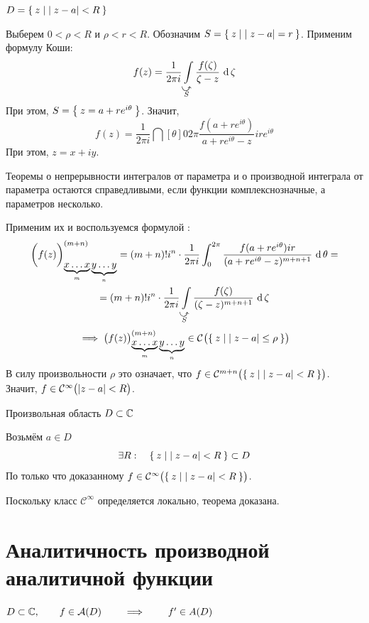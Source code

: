 \begin{eproof}
	\item $ D = \set{z \mid |z - a| < R} $

	Выберем $ 0 < \rho < R $ и $ \rho < r < R $. Обозначим $ S = \set{z \mid |z - a| = r} $. Применим формулу Коши:
	$$ f(z) = \frac1{2\pi i} \cint[\zeta]{\curvedir S}{\frac{f(\zeta)}{\zeta - z}} $$
	При этом, $ S = \set{z = a + re^{i\theta}} $. Значит,
	$$ f(z) = \frac1{2\pi i} \dint[\theta]0{2\pi}{\frac{f(a + re^{i\theta})}{{a + re^{i\theta} - z}}ire^{i\theta}} $$
	При этом, $ z = x + iy $.
	\begin{statement}
		Теоремы о непрерывности интегралов от параметра и о производной интеграла от параметра остаются справедливыми, если функции комплекснозначные, а параметров несколько.
	\end{statement}
	Применим их и воспользуемся формулой :
	\begin{multline*}
		\bigg( f(z) \bigg)_{\underbrace{x \dots x}_m \underbrace{y \dots y}_n}^{(m + n)} = (m + n)!i^n \cdot \frac1{2\pi i} \dint[\theta]0{2\pi}{\frac{f(a + re^{i\theta})ir}{(a + re^{i\theta} - z)^{m + n + 1}}} = \\
		= (m + n)!i^n \cdot \frac1{2\pi i} \cint[\zeta]{\curvedir S}{\frac{f(\zeta)}{(\zeta - z)^{m + n + 1}}}
	\end{multline*}
	$$ \implies \big( f(z) \big)_{\underbrace{x \dots x}_m \underbrace{y \dots y}_n}^{(m + n)} \in \Cont{ \set{z \mid |z - a| \le \rho }} $$
	В силу произвольности $ \rho $ это означает, что $ f \in \Cont[m + n]{\set{z \mid |z - a| < R}} $. \\
	Значит, $ f \in \Cont[\infty]{|z - a| < R} $.

	\item Произвольная область $ D \sub \Co $

	Возьмём $ a \in D $
	$$ \exists R : \quad \set{z \mid |z - a| < R} \sub D $$
	По только что доказанному $ f \in \Cont[\infty]{\set{ z \mid |z - a| < R}} $.

	Поскольку класс $ \mathcal C^\infty $ определяется локально, теорема доказана.
\end{eproof}

\section{Аналитичность производной аналитичной функции}

\begin{theorem}
	$ D \sub \Co, \qquad f \in \mathcal A(D) \qquad \implies \qquad f' \in A(D) $
\end{theorem}

